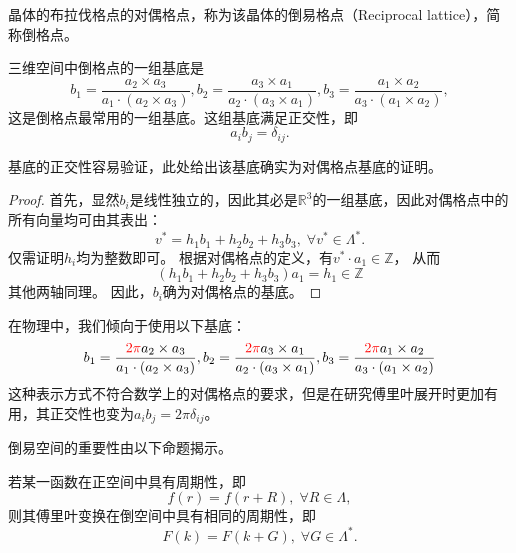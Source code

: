 \begin{definition}
    晶体的布拉伐格点的对偶格点，称为该晶体的倒易格点（Reciprocal lattice），简称倒格点。
\end{definition}

\begin{proposition}
    三维空间中倒格点的一组基底是
    \begin{equation}b_1 = \frac{a_2 \times a_3}{a_1 \cdot (a_2 \times a_3)}, b_2 = \frac{a_3 \times a_1}{a_2 \cdot (a_3 \times a_1)}, b_3 = \frac{a_1 \times a_2}{a_3 \cdot (a_1 \times a_2)},\end{equation}
    这是倒格点最常用的一组基底。这组基底满足正交性，即
    \begin{equation}a_i b_j = \delta_{ij}.\end{equation}
\end{proposition}

基底的正交性容易验证，此处给出该基底确实为对偶格点基底的证明。

\begin{proof}\small
    首先，显然$b_i$是线性独立的，因此其必是$\mathbb R^3$的一组基底，因此对偶格点中的所有向量均可由其表出：
    \begin{equation}v^* = h_1 b_1 + h_2 b_2 + h_3 b_3, \; \forall v^* \in \Lambda^*.\end{equation}
    仅需证明$h_i$均为整数即可。
    根据对偶格点的定义，有$v^* \cdot a_1\in \mathbb Z$，
    从而
    \begin{equation}(h_1 b_1 + h_2 b_2 + h_3 b_3) a_1 = h_1 \in \mathbb Z\end{equation}
    其他两轴同理。
    因此，$b_i$确为对偶格点的基底。
\end{proof}

在物理中，我们倾向于使用以下基底：
\begin{equation}
b_1 = \frac{\mathcolor{red}{2\pi} a_2 \times a_3}{a_1 \cdot (a_2 \times a_3)}, 
b_2 = \frac{\mathcolor{red}{2\pi} a_3 \times a_1}{a_2 \cdot (a_3 \times a_1)}, 
b_3 = \frac{\mathcolor{red}{2\pi} a_1 \times a_2}{a_3 \cdot (a_1 \times a_2)}
\end{equation}
这种表示方式不符合数学上的对偶格点的要求，但是在研究傅里叶展开时更加有用，其正交性也变为$a_i b_j = 2\pi \delta_{ij}$。

倒易空间的重要性由以下命题揭示。
\begin{proposition}
    \label{proposition:pontryagin-duality}
    若某一函数在正空间中具有周期性，即
    \begin{equation}f(r) = f(r + R), \; \forall R \in \Lambda,\end{equation}
    则其傅里叶变换在倒空间中具有相同的周期性，即
    \begin{equation}F(k) = F(k + G), \; \forall G \in \Lambda^*.\end{equation}
\end{proposition}

